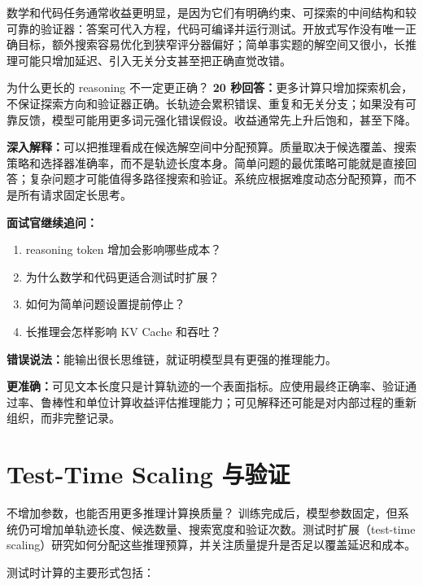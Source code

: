 数学和代码任务通常收益更明显，是因为它们有明确约束、可探索的中间结构和较可靠的验证器：答案可代入方程，代码可编译并运行测试。开放式写作没有唯一正确目标，额外搜索容易优化到狭窄评分器偏好；简单事实题的解空间又很小，长推理可能只增加延迟、引入无关分支甚至把正确直觉改错。

\begin{interviewbox}{为什么更长的 reasoning 不一定更正确？}
\textbf{20 秒回答：}更多计算只增加探索机会，不保证探索方向和验证器正确。长轨迹会累积错误、重复和无关分支；如果没有可靠反馈，模型可能用更多词元强化错误假设。收益通常先上升后饱和，甚至下降。

\textbf{深入解释：}可以把推理看成在候选解空间中分配预算。质量取决于候选覆盖、搜索策略和选择器准确率，而不是轨迹长度本身。简单问题的最优策略可能就是直接回答；复杂问题才可能值得多路径搜索和验证。系统应根据难度动态分配预算，而不是所有请求固定长思考。

\textbf{面试官继续追问：}
\begin{enumerate}
  \item reasoning token 增加会影响哪些成本？
  \item 为什么数学和代码更适合测试时扩展？
  \item 如何为简单问题设置提前停止？
  \item 长推理会怎样影响 KV Cache 和吞吐？
\end{enumerate}
\end{interviewbox}

\begin{wrongbox}
\textbf{错误说法：}能输出很长思维链，就证明模型具有更强的推理能力。

\textbf{更准确：}可见文本长度只是计算轨迹的一个表面指标。应使用最终正确率、验证通过率、鲁棒性和单位计算收益评估推理能力；可见解释还可能是对内部过程的重新组织，而非完整记录。
\end{wrongbox}

\chapter{Test-Time Scaling 与验证}
\label{sec:test-time-scaling}

\begin{motivationbox}{不增加参数，也能否用更多推理计算换质量？}
训练完成后，模型参数固定，但系统仍可增加单轨迹长度、候选数量、搜索宽度和验证次数。测试时扩展（test-time scaling）研究如何分配这些推理预算，并关注质量提升是否足以覆盖延迟和成本。
\end{motivationbox}

测试时计算的主要形式包括：

